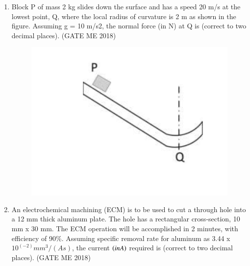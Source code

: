 \documentclass[journal]{IEEEtran}
\numberwithin{equation}{enumi}
\numberwithin{figure}{enumi}
\begin{document}
\begin{enumerate}
\item Block P of mass 2 kg slides down the surface and has a speed 20 m/s at the lowest point, Q, where the local radius of curvature is 2 m as shown in the figure. Assuming g = 10 m/s2, the normal force (in N) at Q is
(correct to two decimal places).
\hfill{(GATE ME 2018)}
\begin{figure}[H]
\centering
    \includegraphics[width = 0.6\columnwidth]{figs/fig3.19.png}
    \caption*{}
    \label{fig:Q54}
    \end{figure}
\item An electrochemical machining (ECM) is to be used to cut a through hole into a 12 mm thick aluminum plate. The hole has a rectangular cross-section, 10 mm x 30 mm. The ECM operation will be accomplished in 2 minutes, with efficiency of 90\%. Assuming specific removal rate for aluminum as 3.44 x $10^(-2) mm^3/(A s)$, the current $\left(in A\right)$ required is
(correct to two decimal places).
\hfill{(GATE ME 2018)}
\end{enumerate}
\end{document}
